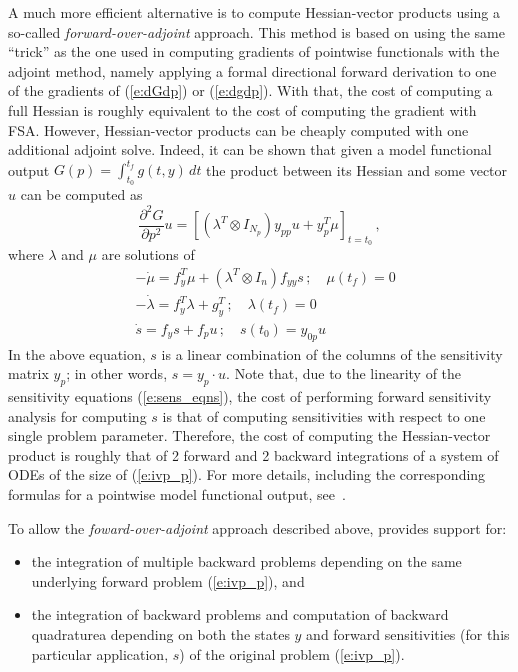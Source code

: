 A much more efficient alternative is to compute Hessian-vector products using
a so-called {\em forward-over-adjoint} approach. This method is based on using
the same ``trick'' as the one used in computing gradients of pointwise
functionals with the adjoint method, namely applying a formal directional forward 
derivation to one of the gradients of (\ref{e:dGdp}) or (\ref{e:dgdp}). With that,
the cost of computing a full Hessian is roughly equivalent to the cost of computing the 
gradient with FSA.
However, Hessian-vector products can be cheaply computed with one additional adjoint solve.
Indeed, it can be shown that given a model functional output 
$G(p) = \int_{t_0}^{t_f} g(t,y) \, dt$ the product between its Hessian and some vector 
$u$ can be computed as
\begin{equation*}
  \frac{\partial^2 G}{\partial p^2} u = 
  \left[ \left(\lambda^T \otimes I_{N_p} \right) y_{pp}u + y_p^T \mu \right]_{t=t_0} \, ,
\end{equation*}
where $\lambda$ and $\mu$ are solutions of
\begin{equation}
  \begin{split}
    &-\dot\mu = f_y^T\mu + \left(\lambda^T \otimes I_n \right) f_{yy} s \, ; \quad \mu(t_f) = 0 \\
    &-\dot\lambda = f_y^T\lambda + g_y^T \, ; \quad \lambda(t_f) = 0 \\
    &\dot s = f_y s + f_p u \, ; \quad s(t_0) = y_{0p} u
  \end{split}
\end{equation}
In the above equation, $s$ is a linear combination of the columns of the
sensitivity matrix $y_p$; in other words, $s = y_p \cdot u$. Note that, due to
the linearity of the sensitivity equations (\ref{e:sens_eqns}), the cost of 
performing forward sensitivity analysis for computing $s$ is that of
computing sensitivities with respect to one single problem parameter.
Therefore, the cost of computing the Hessian-vector product is roughly
that of 2 forward and 2 backward integrations of a system of ODEs of the
size of (\ref{e:ivp_p}).
For more details, including the corresponding formulas for a pointwise model
functional output, see~\cite{OzBa:05}.

\bigskip

To allow the {\em foward-over-adjoint} approach described above, {\cvodes}
provides support for:
\begin{itemize}
\item the integration of multiple backward problems depending on the same
  underlying forward problem (\ref{e:ivp_p}), and
\item the integration of backward problems and computation of backward quadraturea
  depending on both the states $y$ and forward sensitivities (for this particular 
  application, $s$) of the original problem (\ref{e:ivp_p}).
\end{itemize}
